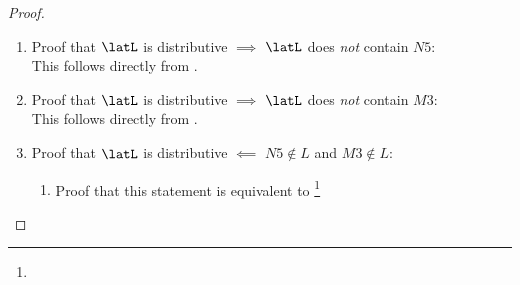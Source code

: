 \begin{proof}
\begin{enumerate}
  \item Proof that $\latL$ is distributive $\implies$ $\latL$ does \emph{not} contain $N5$:\\
    This follows directly from .

  \item Proof that $\latL$ is distributive $\implies$ $\latL$ does \emph{not} contain $M3$:\\
    This follows directly from .

  \item Proof that $\latL$ is distributive $\impliedby$ $N5\notin L$ and $M3\notin L$:



    \begin{enumerate}
      \item Proof that this statement is equivalent to
\footnote{
%
%
%
%
%
%
}
\end{enumerate}
\end{enumerate}
\end{proof}
